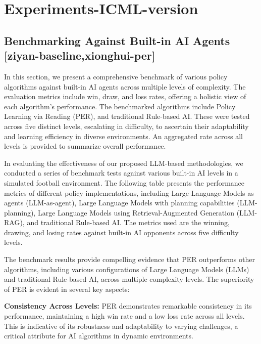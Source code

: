 

\section{Experiments-ICML-version}
\subsection{Benchmarking Against Built-in AI Agents [ziyan-baseline,xionghui-per]}
In this section, we present a comprehensive benchmark of various policy algorithms against built-in AI agents across multiple levels of complexity. The evaluation metrics include win, draw, and loss rates, offering a holistic view of each algorithm's performance. The benchmarked algorithms include Policy Learning via Reading (PER),  and traditional Rule-based AI. These were tested across five distinct levels, escalating in difficulty, to ascertain their adaptability and learning efficiency in diverse environments. An aggregated rate across all levels is provided to summarize overall performance.


In evaluating the effectiveness of our proposed LLM-based methodologies, we conducted a series of benchmark tests against various built-in AI levels in a simulated football environment. The following table presents the performance metrics of different policy implementations, including Large Language Models as agents (LLM-as-agent), Large Language Models with planning capabilities (LLM-planning), Large Language Models using Retrieval-Augmented Generation (LLM-RAG), and traditional Rule-based AI. The metrics used are the winning, drawing, and losing rates against built-in AI opponents across five difficulty levels.




The benchmark results provide compelling evidence that PER outperforms other algorithms, including various configurations of Large Language Models (LLMs) and traditional Rule-based AI, across multiple complexity levels. The superiority of PER is evident in several key aspects:

\textbf{Consistency Across Levels:} PER demonstrates remarkable consistency in its performance, maintaining a high win rate and a low loss rate across all levels. This is indicative of its robustness and adaptability to varying challenges, a critical attribute for AI algorithms in dynamic environments.


